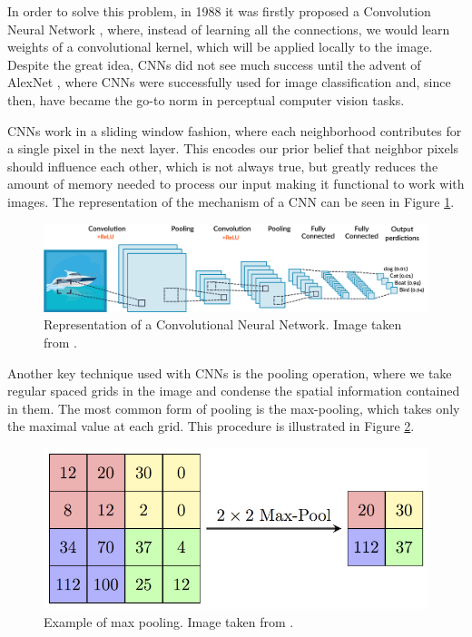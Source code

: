 In order to solve this problem, in 1988 it was firstly proposed a Convolution Neural Network \cite{cnn_gordo}, where, instead of learning all the connections, we would learn weights of a convolutional kernel, which will be applied locally to the image. Despite the great idea, CNNs did not see much success until the advent of AlexNet \cite{alex}, where CNNs were successfully used for image classification and, since then, have became the go-to norm in perceptual computer vision tasks. 

CNNs work in a sliding window fashion, where each neighborhood contributes for a single pixel in the next layer. This encodes our prior belief that neighbor pixels should influence each other, which is not always true, but greatly reduces the amount of memory needed to process our input making it functional to work with images. The representation of the mechanism of a CNN can be seen in Figure \ref{cnn}.

\begin{figure}[H]
    \includegraphics[width=\textwidth]{Cap2-Methods/image2.png}
    \centering
	\caption{Representation of a Convolutional Neural Network. Image taken from \cite{cnnimg}.}
	\label{cnn}
\end{figure}

Another key technique used with CNNs is the pooling operation, where we take regular spaced grids in the image and condense the spatial information contained in them. The most common form of pooling is the max-pooling, which takes only the maximal value at each grid. This procedure is illustrated in Figure \ref{pooling}.

\begin{figure}[H]
    \includegraphics[width=.7\textwidth]{Cap2-Methods/MaxpoolSample2.png}
    \centering
	\caption{Example of max pooling. Image taken from \cite{poolimg}.}
	\label{pooling}
\end{figure}

